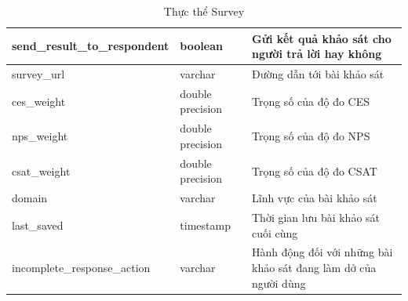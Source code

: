 \begin{center}
\begin{table}[H]
{\begin{tabular}{ |p{4.5cm} |p{3cm} |p{6.5cm}|}
                                \hline
                                send{\_}result{\_}to{\_}respondent & boolean & Gửi kết quả khảo sát cho người trả lời hay không \\
                                \hline
                                survey{\_}url & varchar & Đường dẫn tới bài khảo sát \\
                                \hline
                                ces{\_}weight & double precision & Trọng số của độ đo CES \\
                                \hline
                                nps{\_}weight & double precision & Trọng số của độ đo NPS \\
                                \hline
                                csat{\_}weight & double precision & Trọng số của độ đo CSAT \\
                                \hline
                                domain & varchar & Lĩnh vực của bài khảo sát \\
                                \hline
                                last{\_}saved & timestamp & Thời gian lưu bài khảo sát cuối cùng \\
                                \hline
                                incomplete{\_}response{\_}action & varchar & Hành động đối với những bài khảo sát đang làm dở của người dùng \\
                                \hline
                        \end{tabular}
                }
                \caption{Thực thể Survey}
        \end{table}
\end{center}

